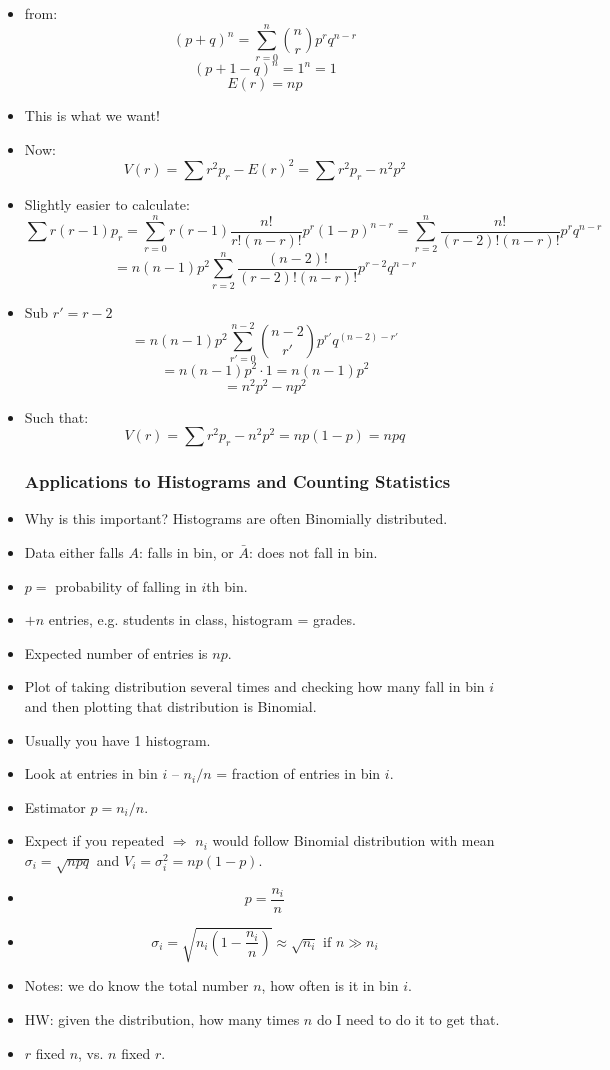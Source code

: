 \begin{itemize}
    \item from:
          \[ (p+q)^n = \sum_{r=0}^n \binom{n}{r} p^r q^{n-r} \]
          \[ (p+1-q)^n = 1^n = 1 \]
          \[ E(r) = np \]
    \item This is what we want!
    \item Now:
          \[ V(r) = \sum r^2 p_r - E(r)^2 = \sum r^2 p_r - n^2 p^2 \]
    \item Slightly easier to calculate:
          \[ \sum r(r-1) p_r = \sum_{r=0}^n r(r-1) \frac{n!}{r!(n-r)!} p^r (1-p)^{n-r} = \sum_{r=2}^n \frac{n!}{(r-2)!(n-r)!} p^r q^{n-r} \]
          \[ = n(n-1) p^2 \sum_{r=2}^n \frac{(n-2)!}{(r-2)!(n-r)!} p^{r-2} q^{n-r} \]
    \item Sub $r' = r-2$
          \[ = n(n-1) p^2 \sum_{r'=0}^{n-2} \binom{n-2}{r'} p^{r'} q^{(n-2)-r'} \]
          \[ = n(n-1)p^2 \cdot 1 = n(n-1)p^2 \]
          \[ = n^2 p^2 - np^2 \]
    \item Such that:
          \[ \boxed{V(r) = \sum r^2 p_r - n^2 p^2 } = np (1 - p) = npq \]

          \subsubsection*{Applications to Histograms and Counting Statistics}

    \item Why is this important? Histograms are often Binomially distributed.
    \item Data either falls $A$: falls in bin, or $\bar{A}$: does not fall in bin.
    \item $p =$ probability of falling in $i$th bin.
    \item $+n$ entries, e.g. students in class, histogram = grades.
    \item Expected number of entries is $np$.
    \item Plot of taking distribution several times and checking how many fall in bin $i$ and then plotting that distribution is Binomial.
    \item Usually you have 1 histogram.
    \item Look at entries in bin $i$ -- $n_i/n$ = fraction of entries in bin $i$.
    \item Estimator $p = n_i/n$.
    \item Expect if you repeated $\Rightarrow$ $n_i$ would follow Binomial distribution with mean $\sigma_i = \sqrt{n p q}$ and $V_i = \sigma_i^2 = np (1 - p)$.
    \item \[ p = \frac{n_i}{n} \]
    \item \[ \boxed{\sigma_i = \sqrt{n_i \left(1 - \frac{n_i}{n}\right)}} \approx \sqrt{n_i} \text{ if } n \gg n_i \]

    \item Notes: we do know the total number $n$, how often is it in bin $i$.
    \item HW: given the distribution, how many times $n$ do I need to do it to get that.
    \item $r$ fixed $n$, vs. $n$ fixed $r$.
\end{itemize}
